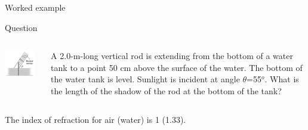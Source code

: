 {
\problemslide

%
%
%

\begin{frame}{Worked example}

\begin{blockexmplque}{Question}
\begin{columns}
  \begin{column}{0.25\textwidth}
   \begin{center}
     \includegraphics[width=0.90\textwidth]{./images/problems/lect8_pole_shadow.png}
   \end{center}
  \end{column}
  \begin{column}{0.75\textwidth}
     A 2.0-m-long vertical rod is extending
     from the bottom of a water tank to a point 50 cm above the surface
     of the water. The bottom of the water tank is level.
     Sunlight is incident at angle $\theta$=55$^{o}$. What
     is the length of the shadow of the rod at the bottom of the tank?
  \end{column}
\end{columns}
The index of refraction for air (water) is 1 (1.33).
\end{blockexmplque}

\vspace{0.2cm}


\end{frame}}
